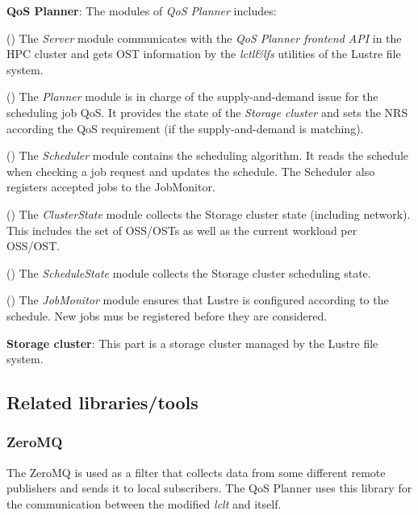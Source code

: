 \documentclass[10pt]{article}
\begin{document}
\textbf{QoS Planner}: The modules of \emph{QoS Planner} includes:

(\textbf{{}}) The \emph{Server} module communicates with the \emph{QoS Planner frontend API} in the HPC cluster and gets OST information by the \emph{lctl\&lfs} utilities of the Lustre file system.

(\textbf{{}})  The \emph{Planner} module is in charge of the supply-and-demand issue for the scheduling job QoS. It provides the state of the \emph{Storage cluster} and sets the NRS according the QoS requirement (if the supply-and-demand is matching).

(\textbf{{}}) The \emph{Scheduler} module contains the scheduling algorithm. It reads the schedule when checking a job request and updates the schedule. The Scheduler also registers accepted jobs to the JobMonitor.

(\textbf{{}}) The \emph{ClusterState} module collects the Storage cluster state (including network). This includes the set of OSS/OSTs as well as the current workload per OSS/OST.

(\textbf{{}}) The \emph{ScheduleState} module collects the Storage cluster scheduling state.

(\textbf{{}}) The \emph{JobMonitor} module ensures that Lustre is configured according to the schedule. New jobs mus be registered before they are considered.

\textbf{Storage cluster}: This part is a storage cluster managed by the Lustre file system.

%
\subsection{Related libraries/tools}
%
\subsubsection{ZeroMQ}
%
The ZeroMQ is used as a filter that collects data from some different remote publishers and sends it to local subscribers. The QoS Planner uses this library for the communication between the modified \emph{lclt} and itself.
\end{document}
